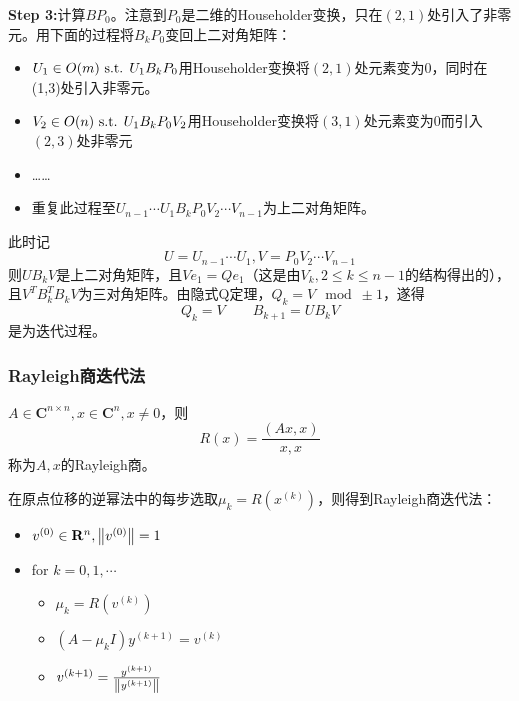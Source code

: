 \documentclass{ctexart}
\begin{document}
\textbf{Step 3:}计算$BP_0$。注意到$P_0$是二维的Householder变换，只在$(2,1)$处引入了非零元。用下面的过程将$B_kP_0$变回上二对角矩阵：
\begin{itemize}
\item $U_1\in O(m)\text{ s.t. } U_1B_kP_0$用Householder变换将$(2,1)$处元素变为0，同时在(1,3)处引入非零元。
\item $V_2\in O(n)\text{ s.t. } U_1B_kP_0V_2$用Householder变换将$(3,1)$处元素变为0而引入$(2,3)$处非零元
\item ……
\item 重复此过程至$U_{n-1}\cdots U_1 B_kP_0V_2\cdots V_{n-1}$为上二对角矩阵。
\end{itemize}
此时记
\[U=U_{n-1}\cdots U_1,V=P_0V_2\cdots V_{n-1}\]则$UB_kV$是上二对角矩阵，且$Ve_1=Qe_1$（这是由$V_k,2\leq k\leq n-1$的结构得出的），且$V^TB_k^TB_k V$为三对角矩阵。由隐式Q定理，$Q_k=V\mod \pm 1$，遂得
\[Q_k=V\qquad B_{k+1}=UB_k V\]
是为迭代过程。

\subsubsection{Rayleigh商迭代法}
\begin{Def}
$A\in \mathbf{C}^{n\times n},x\in \mathbf{C}^n,x\neq 0$，则
\[R(x)=\frac{(Ax,x)}{x,x}\]
称为$A,x$的Rayleigh商。
\end{Def}
在原点位移的逆幂法中的每步选取$\mu_k=R(x^{(k)})$，则得到Rayleigh商迭代法：
\begin{itemize}
\item $v^{(0)}\in\mathbf{R}^n,\left\|v^{(0)} \right\|=1$
\item for $k=0,1,\cdots$
\begin{itemize}
\item $\mu_k=R(v^{(k)})$
\item $(A-\mu_kI)y^{(k+1)}=v^{(k)}$
\item $v^{(k+1)}=\frac{y^{(k+1)}}{\left\|y^{(k+1)} \right\|}$
\end{itemize}
\end{itemize}
\end{document}
